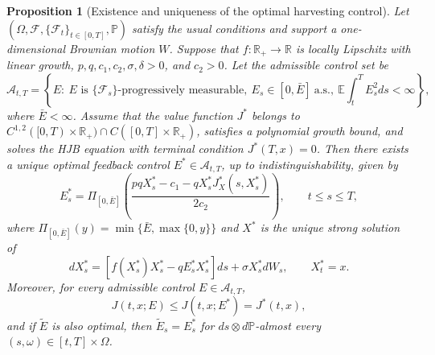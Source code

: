 \documentclass[11pt]{article}
\newtheorem{prop}[theorem]{\bf Proposition}
\begin{document}
	\begin{prop}[Existence and uniqueness of the optimal harvesting control]\label{p3}
		Let $(\Omega,\mathcal{F},\{\mathcal{F}_t\}_{t\in[0,T]},\mathbb{P})$ satisfy the usual conditions and support a one-dimensional Brownian motion $W$. Suppose that $f:\mathbb{R}_+\to\mathbb{R}$ is locally Lipschitz with linear growth, $p,q,c_1,c_2,\sigma,\delta>0$, and $c_2>0$. Let the admissible control set be
		\[
		\mathcal{A}_{t,T}
		=
		\left\{
		E:\ E \text{ is } \{\mathcal{F}_s\}\text{-progressively measurable},\
		E_s\in[0,\bar E]\ \text{a.s.},\
		\mathbb{E}\int_t^T E_s^2ds<\infty
		\right\},
		\]
		where $\bar E<\infty$. Assume that the value function $J^*$ belongs to $C^{1,2}([0,T)\times\mathbb{R}_+)\cap C([0,T]\times\mathbb{R}_+)$, satisfies a polynomial growth bound, and solves the HJB equation with terminal condition $J^*(T,x)=0$. Then there exists a unique optimal feedback control $E^*\in\mathcal{A}_{t,T}$, up to indistinguishability, given by
		\[
		E_s^*
		=
		\Pi_{[0,\bar E]}
		\left(
		\frac{pqX_s^*-c_1-qX_s^*J_X^*(s,X_s^*)}{2c_2}
		\right),
		\qquad t\le s\le T,
		\]
		where $\Pi_{[0,\bar E]}(y)=\min\{\bar E,\max\{0,y\}\}$ and $X^*$ is the unique strong solution of
		\[
		dX_s^*
		=
		\left[f(X_s^*)X_s^*-qE_s^*X_s^*\right]ds
		+
		\sigma X_s^*dW_s,
		\qquad X_t^*=x.
		\]
		Moreover, for every admissible control $E\in\mathcal{A}_{t,T}$,
		\[
		J(t,x;E)\le J(t,x;E^*)=J^*(t,x),
		\]
		and if $\widetilde E$ is also optimal, then $\widetilde E_s=E_s^*$ for $ds\otimes d\mathbb{P}$-almost every $(s,\omega)\in[t,T]\times\Omega$.
	\end{prop}
	
\end{document}
